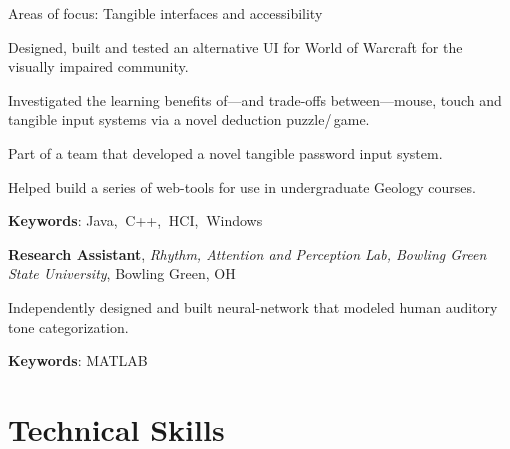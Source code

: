 \documentclass[10pt, letter]{article}
\newcommand{\years}[1]{\marginnote{\footnotesize #1}}
\newenvironment{desc*}{
  \begin{description}
    \setlength{\itemsep}{0.2pt}
    \setlength{\parskip}{-1pt}
    \setlength{\parsep}{0pt}
  }{
  \end{description}
}
\begin{document}
Areas of focus: Tangible interfaces and accessibility
\begin{itemize}[leftmargin=*, parsep=0pt, rightmargin=1.5cm]
  {\light
\item Designed, built and tested an alternative UI for World of Warcraft for
  the visually impaired community. 
\item Investigated the learning benefits of---and trade-offs between---mouse,
  touch and tangible input systems via a novel deduction puzzle/\,game.
\item Part of a team that developed a novel tangible password input system.
\item Helped build a series of web-tools for use in undergraduate Geology courses.
  }
\end{itemize}
\begin{desc*}
\item[\rm \color{redblue} \textbf{Keywords}:] Java,$\:$ C++,$\:$ HCI,$\:$ Windows\\
\end{desc*}

\years{2008 - 2010} 
\textbf{\fontsize{10.5pt}{1em}\selectfont Research Assistant},
\textit{Rhythm, Attention and Perception Lab, Bowling Green State
  University}, Bowling Green, OH\\ 
\vspace{-.3cm}
\begin{itemize}[leftmargin=*, parsep=0pt, rightmargin=1.5cm]
  {\light
\item Independently designed and built neural-network that
  modeled human auditory tone categorization.
  }
\end{itemize}
\begin{desc*}
\item[\rm \color{redblue} \textbf{Keywords}:] MATLAB\\
\end{desc*}

\newpage
\section*{Technical Skills}
\end{document}
